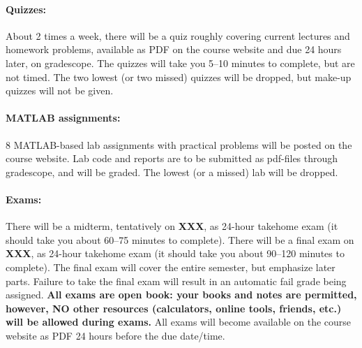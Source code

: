 \documentclass[11pt,letter]{article}
\begin{document}
\paragraph{Quizzes:}About 2 times a week, there will be a quiz roughly covering current lectures and homework problems, available as PDF on the course website and due 24 hours later, on gradescope. The quizzes will take you 5--10 minutes to complete, but are not timed. The two lowest (or two missed) quizzes will be dropped, but make-up quizzes will not be given. 

\paragraph{MATLAB assignments:} 8 MATLAB-based lab assignments with practical problems will be posted on the course website. %
Lab code and reports are to be submitted as pdf-files through gradescope, and will be graded. The lowest (or a missed) lab will be dropped.


%


\paragraph{Exams:} There will be a midterm, tentatively on \textbf{XXX}, as 24-hour takehome exam (it should take you about 60--75 minutes to complete). There will be a final exam on \textbf{XXX}, as 24-hour takehome exam (it should take you about 90--120 minutes to complete). The final exam will cover the entire semester, but emphasize later parts. Failure to take the final exam will result in an automatic fail grade being assigned. \textbf{All exams are open book: your books and notes are permitted, however, NO other resources (calculators, online tools, friends, etc.) will be allowed during exams.} All exams will become available on the course website as PDF 24 hours before the due date/time.
\end{document}
